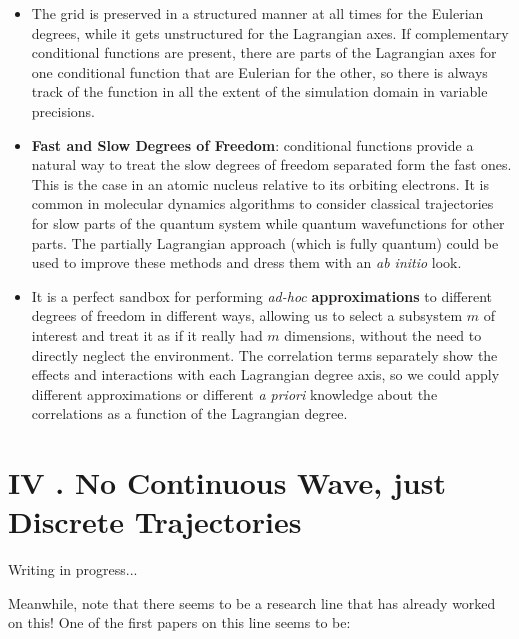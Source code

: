 \documentclass[11pt, a4paper]{article} %
\begin{document}
\begin{itemize}
\item The grid is preserved in a structured manner at all times for the Eulerian degrees, while it gets unstructured for the Lagrangian axes. If complementary conditional functions are present, there are parts of the Lagrangian axes for one conditional function that are Eulerian for the other, so there is always track of the function in all the extent of the simulation domain in variable precisions.
\item {\bf Fast and Slow Degrees of Freedom}: conditional functions provide a natural way to treat the slow degrees of freedom separated form the fast ones. This is the case in an atomic nucleus relative to its orbiting electrons. It is common in molecular dynamics algorithms to consider classical trajectories for slow parts of the quantum system while quantum wavefunctions for other parts. The partially Lagrangian approach (which is fully quantum) could be used to improve these methods and dress them with an {\em ab initio} look.
\item It is a perfect sandbox for performing {\em ad-hoc} {\bf approximations} to different degrees of freedom in different ways, allowing us to select a subsystem $m$ of interest and treat it as if it really had $m$ dimensions, without the need to directly neglect the environment. The correlation terms separately show the effects and interactions with each Lagrangian degree axis, so we could apply different approximations or different {\em a priori} knowledge about the correlations as a function of the Lagrangian degree.
\end{itemize}







\newpage
\section*{IV . No Continuous Wave, just Discrete Trajectories}

Writing in progress...

Meanwhile, note that there seems to be a research line that has already worked on this! One of the first papers on this line seems to be:
\end{document}
